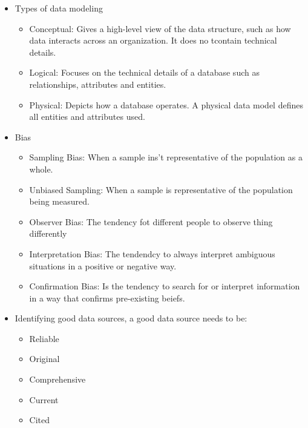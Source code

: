 \documentclass[a4paper]{article}
\begin{document}
\begin{itemize}
        \item Types of data modeling 
            \begin{itemize}
                \item Conceptual: Gives a high-level view of the data structure, such as how data interacts across an organization. It does no tcontain technical details.
                \item Logical: Focuses on the technical details of a database such as relationships, attributes and entities. 
                \item Physical: Depicts how a database operates. A physical data model defines all entities and attributes used.
            \end{itemize}

        \item Bias
            \begin{itemize}
                \item Sampling Bias: When a sample ins't representative of the population as a whole.
                \item Unbiased Sampling: When a sample is representative of the population being measured.
                \item Observer Bias: The tendency fot different people to observe thing differently
                \item Interpretation Bias: The tendendcy to always interpret ambiguous situations in a positive or negative way.
                \item Confirmation Bias: Is the tendency to search for or interpret information in a way that confirms pre-existing beiefs.
            \end{itemize}

        \item Identifying good data sources, a good data source needs to be:
            \begin{itemize}
                \item Reliable
                \item Original
                \item Comprehensive
                \item Current 
                \item Cited
            \end{itemize}



\end{itemize}
\end{document}
